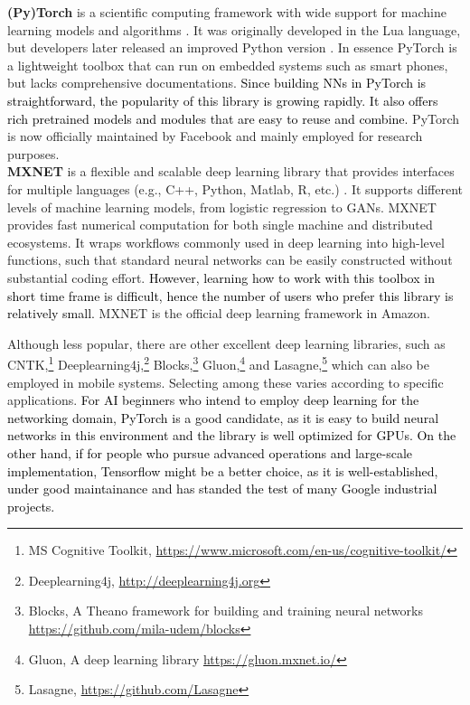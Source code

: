 \documentclass[journal,comsoc,letter]{IEEEtran}
\newcommand{\edit}[1]{\textcolor{black}{#1}}
\newcommand{\rev}[1]{\textcolor{black}{#1}}
\begin{document}
\noindent \textbf{(Py)Torch} is a scientific computing framework with wide support for machine learning models and algorithms \cite{torch}. It was originally  developed in the Lua language, but developers later released an improved Python version \cite{paszke2017automatic}. In essence PyTorch is a lightweight toolbox that can run on embedded systems such as smart phones, but lacks comprehensive documentations. \edit{Since building NNs in PyTorch is straightforward,  the popularity of this library is growing rapidly.} \rev{It also offers rich pretrained models and modules that are easy to reuse and combine.} PyTorch is now officially maintained by Facebook and mainly employed for research purposes.\\ 

\noindent \textbf{MXNET} is a flexible and scalable deep learning library that provides interfaces for multiple languages (e.g., C++, Python, Matlab, R, etc.) \cite{chen2015mxnet}. It supports different levels of machine learning models, from logistic regression to GANs. MXNET provides fast numerical computation for both single machine and distributed ecosystems. It wraps workflows commonly used in deep learning into high-level functions, such that standard neural networks can be easily constructed without substantial coding effort. \edit{However, learning how to work with this toolbox in short time frame is difficult, hence the number of users who prefer this library is relatively small.}  MXNET is the official deep learning framework in Amazon. 

Although less popular, there are other excellent deep learning libraries, such as CNTK,\footnote{MS Cognitive Toolkit, \url{https://www.microsoft.com/en-us/cognitive-toolkit/}} Deeplearning4j,\footnote{Deeplearning4j, \url{http://deeplearning4j.org}} Blocks,\footnote{Blocks, A Theano framework for building and training neural networks \url{https://github.com/mila-udem/blocks}} Gluon,\footnote{Gluon, A deep learning library \url{https://gluon.mxnet.io/}} and Lasagne,\footnote{Lasagne, \url{https://github.com/Lasagne}} which can also be employed in mobile systems. Selecting among these varies according to specific applications. \rev{For AI beginners who intend to employ deep learning for the networking domain, PyTorch is a good candidate, as it is easy to build neural networks in this environment and the library is well optimized for GPUs. On the other hand, if for people who pursue advanced operations and large-scale implementation, Tensorflow might be a better choice, as it is well-established, under good maintainance and has standed the test of many Google industrial projects.}
\end{document}
